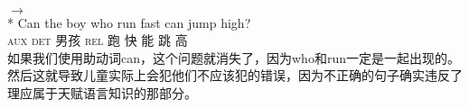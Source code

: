 \glt {}\\
$\to$\\
 {}* \gll Can the boy who run fast can jump high?\\
          \textsc{aux} \textsc{det} 男孩 \textsc{rel} 跑 快 能 跳 高\\
\zl
如果我们使用助动词can，这个问题就消失了，因为who和run一定是一起出现的。然后这就导致儿童实际上会犯他们不应该犯的错误，因为不正确的句子确实违反了理应属于天赋语言知识的那部分。

